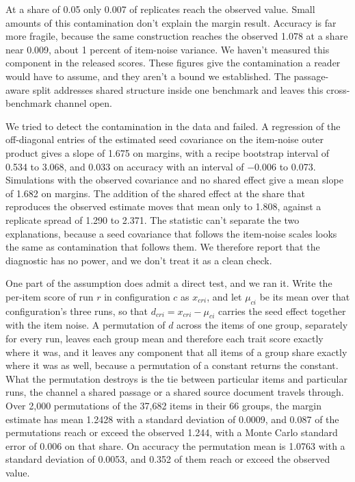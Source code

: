 At a share of 0.05 only 0.007 of replicates reach the observed value. Small amounts of this contamination don't explain the margin result. Accuracy is far more fragile, because the same construction reaches the observed 1.078 at a share near 0.009, about 1 percent of item-noise variance. We haven't measured this component in the released scores. These figures give the contamination a reader would have to assume, and they aren't a bound we established. The passage-aware split addresses shared structure inside one benchmark and leaves this cross-benchmark channel open.

We tried to detect the contamination in the data and failed. A regression of the off-diagonal entries of the estimated seed covariance on the item-noise outer product gives a slope of 1.675 on margins, with a recipe bootstrap interval of 0.534 to 3.068, and 0.033 on accuracy with an interval of $-0.006$ to 0.073. Simulations with the observed covariance and no shared effect give a mean slope of 1.682 on margins. The addition of the shared effect at the share that reproduces the observed estimate moves that mean only to 1.808, against a replicate spread of 1.290 to 2.371. The statistic can't separate the two explanations, because a seed covariance that follows the item-noise scales looks the same as contamination that follows them. We therefore report that the diagnostic has no power, and we don't treat it as a clean check.

One part of the assumption does admit a direct test, and we ran it. Write the per-item score of run $r$ in configuration $c$ as $x_{cri}$, and let $\mu_{ci}$ be its mean over that configuration's three runs, so that $d_{cri}=x_{cri}-\mu_{ci}$ carries the seed effect together with the item noise. A permutation of $d$ across the items of one group, separately for every run, leaves each group mean and therefore each trait score exactly where it was, and it leaves any component that all items of a group share exactly where it was as well, because a permutation of a constant returns the constant. What the permutation destroys is the tie between particular items and particular runs, the channel a shared passage or a shared source document travels through. Over 2,000 permutations of the 37,682 items in their 66 groups, the margin estimate has mean 1.2428 with a standard deviation of 0.0009, and 0.087 of the permutations reach or exceed the observed 1.244, with a Monte Carlo standard error of 0.006 on that share. On accuracy the permutation mean is 1.0763 with a standard deviation of 0.0053, and 0.352 of them reach or exceed the observed value.


